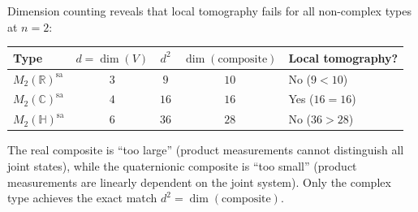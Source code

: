 \begin{remark}\label{rem:negative-checks}
Dimension counting reveals that local tomography fails for all
non-complex types at $n=2$:
\begin{center}
\begin{tabular}{lcccl}
\toprule
Type & $d = \dim(V)$ & $d^2$ & $\dim(\text{composite})$
& Local tomography? \\
\midrule
$M_2(\mathbb{R})^{\mathrm{sa}}$ & $3$ & $9$ & $10$ & No\; ($9 < 10$) \\
$M_2(\mathbb{C})^{\mathrm{sa}}$ & $4$ & $16$ & $16$ & Yes\; ($16 = 16$)\\
$M_2(\mathbb{H})^{\mathrm{sa}}$ & $6$ & $36$ & $28$ & No\; ($36 > 28$)\\
\bottomrule
\end{tabular}
\end{center}
The real composite is ``too large'' (product measurements cannot
distinguish all joint states), while the quaternionic composite is ``too
small'' (product measurements are linearly dependent on the joint system).
Only the complex type achieves the exact match $d^2 =
\dim(\text{composite})$.
\end{remark}
